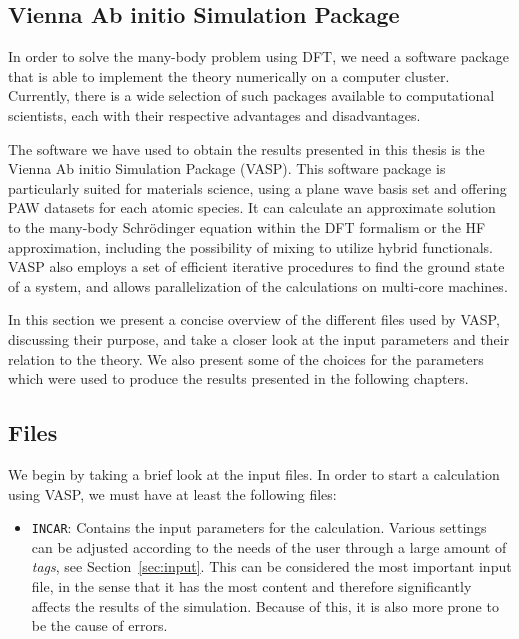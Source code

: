 \begin{refsection} 
 
\chapter{Vienna Ab initio Simulation Package} \label{appendix:sec-VASP} 
 
In order to solve the many-body problem using DFT, we need a software package 
that is able to implement the theory numerically on a computer cluster. 
Currently, there is a wide selection of such packages available to 
computational scientists, each with their respective advantages and 
disadvantages. 
 
The software we have used to obtain the results presented in this thesis is 
the Vienna Ab initio Simulation Package (VASP)\cite{vasp}. This software 
package is particularly suited for materials science, using a plane wave basis 
set and offering PAW datasets for each atomic species. It can calculate an 
approximate solution to the many-body Schr\"odinger equation within the DFT 
formalism or the HF approximation, including the possibility of mixing to 
utilize hybrid functionals. VASP also employs a set of efficient iterative 
procedures to find the ground state of a system, and allows parallelization of 
the calculations on multi-core machines. 
 
In this section we present a concise overview of the different files used by 
VASP, discussing their purpose, and take a closer look at the input parameters 
and their relation to the theory. We also present some of the choices for the 
parameters which were used to produce the results presented in the following 
chapters. 
 
\section{Files} 
 
We begin by taking a brief look at the input files. In order to start a 
calculation using VASP, we must have at least the following files: 
 
\begin{itemize} 
 
 \label{appendix:sec-INCAR} 
\item \texttt{INCAR}: Contains the input parameters for the calculation. 
Various settings can be adjusted according to the needs of the user through a 
large amount of \textit{tags}, see Section~\ref{sec:input}. This can be 
considered the most important input file, in the sense that it has the most 
content and therefore significantly affects the results of the simulation. 
Because of this, it is also more prone to be the cause of errors.  
 

\end{itemize}
\end{refsection}
